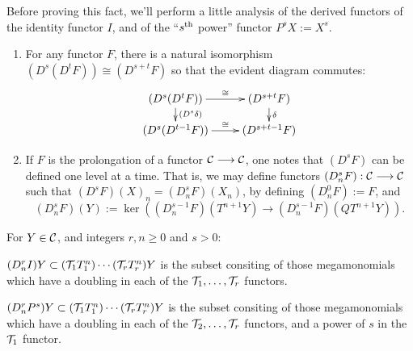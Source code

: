 \documentclass[10pt]{article}
\newcommand{\Comm}{\calC}
\begin{document}
\begin{convergenceOLD}
Before proving this fact, we'll perform a little analysis of the derived functors of the identity functor $I$, and of the ``$s^\textup{th}$ power'' functor $P^sX:=X^s$.
\begin{enumerate}\squishlist
\setlength{\parindent}{.25in}
\item For any functor $F$, there is a natural isomorphism $(D^s(D^tF))\cong (D^{s+t}F)$ so that the evident diagram commutes:
\[\xymatrix@R=4mm{
(D^s(D^tF))
\ar[r]^-{\cong}
\ar[d]^-{(D^s\delta)}
&%
(D^{s+t}F)
\ar[d]^-{\delta}
\\%
(D^s(D^{t-1}F))
\ar[r]^-{\cong}&%
(D^{s+t-1}F)
}\]
\item If $F$ is the prolongation of a functor $\Comm\to\Comm$, one notes that $(D^sF)$ can be defined one level at a time. That is,  we may define functors $(D^s_nF):\Comm\to\Comm$ such that $(D^sF)(X)_n=(D^s_nF)(X_n)$, by defining $(D^0_nF):=F$, and
\[(D^s_nF)(Y):=\ker((D^{s-1}_nF)(T^{n+1}Y)\to (D^{s-1}_nF)(QT^{n+1}Y)).\]
\end{enumerate}
\begin{lem}
For $Y\in\Comm$, and integers $r,n\geq0$ and $s>0$:
\begin{itemise}
\setlength{\parindent}{.25in}
\item $(D^r_nI)Y\subset (\mathcal{T}_1T^n_1)\cdots (\mathcal{T}_rT^n_r)Y$ is the subset consiting of those mega\-monomials which have a doubling in each of the $\mathcal{T}_1,\ldots,\mathcal{T}_r$ functors.
\item $(D^r_nP^{s})Y\subset (\mathcal{T}_1T^n_1)\cdots (\mathcal{T}_rT^n_r)Y$ is the subset consiting of those mega\-monomials which have a doubling in each of the $\mathcal{T}_2,\ldots,\mathcal{T}_r$ functors, and a power of $s$ in the $\mathcal{T}_1$ functor.
\end{itemise}


\end{lem}
\end{convergenceOLD}
\end{document}
